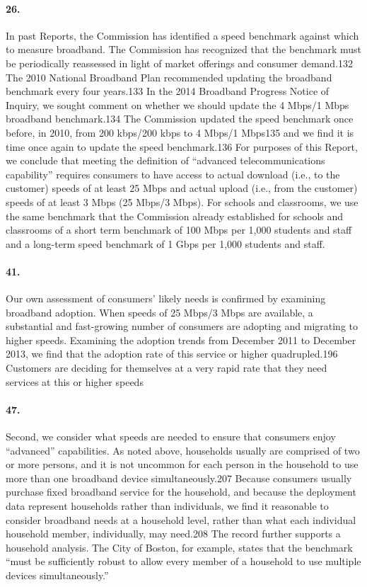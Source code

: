 \paragraph{26. } In past Reports, the Commission has identified a speed benchmark against which to
measure broadband. The Commission has recognized that the benchmark must be periodically reassessed in light of market offerings and consumer demand.132 The 2010 National Broadband Plan recommended updating the broadband benchmark every four years.133 In the 2014 Broadband Progress Notice of Inquiry, we sought comment on whether we should update the 4 Mbps/1 Mbps broadband benchmark.134 The Commission updated the speed benchmark once before, in 2010, from 200 kbps/200 kbps to 4 Mbps/1 Mbps135 and we find it is time once again to update the speed benchmark.136 For purposes of this Report, we conclude that meeting the definition of ``advanced telecommunications capability'' requires consumers to have access to actual download (i.e., to the customer) speeds of at least 25 Mbps and actual upload (i.e., from the customer) speeds of at least 3 Mbps (25 Mbps/3 Mbps). For schools and classrooms, we use the same benchmark that the Commission already established for schools and classrooms of a short term benchmark of 100 Mbps per 1,000 students and staff and a long-term speed benchmark of 1 Gbps per 1,000 students and staff.

\paragraph{41. } Our own assessment of consumers’ likely needs is confirmed by examining broadband
adoption. When speeds of 25 Mbps/3 Mbps are available, a substantial and fast-growing number of consumers are adopting and migrating to higher speeds. Examining the adoption trends from December 2011 to December 2013, we find that the adoption rate of this service or higher quadrupled.196 Customers are deciding for themselves at a very rapid rate that they need services at this or higher speeds

\paragraph{47. }
Second, we consider what speeds are needed to ensure that consumers enjoy ``advanced''
capabilities. As noted above, households usually are comprised of two or more persons, and it is not uncommon for each person in the household to use more than one broadband device simultaneously.207 Because consumers usually purchase fixed broadband service for the household, and because the deployment data represent households rather than individuals, we find it reasonable to consider broadband needs at a household level, rather than what each individual household member, individually, may need.208 The record further supports a household analysis. The City of Boston, for example, states that the benchmark ``must be sufficiently robust to allow every member of a household to use multiple devices simultaneously.''


